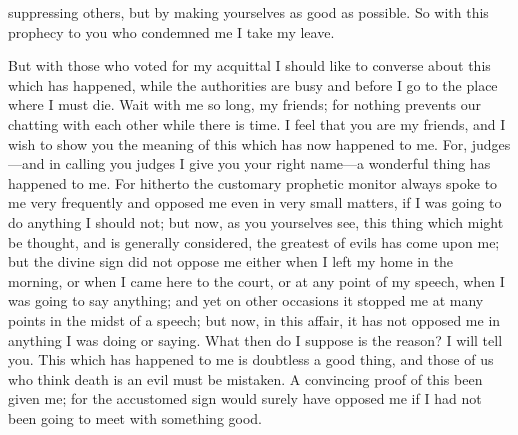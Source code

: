 suppressing others, but by making yourselves as good as possible. So with this prophecy to you who condemned me  I take my leave.

But with those who voted for my acquittal I should like to converse about this which has happened, while the authorities are busy and before I go to the place where I must die. Wait with me so long, my friends; for nothing prevents our chatting with each other  while there is time. I feel that you are my friends, and I wish to show you the meaning of this which has now happened to me. For, judges—and in calling you judges I give you your right name—a wonderful thing has happened to me. For hitherto the customary prophetic monitor always spoke to me very frequently and opposed me even in very small matters, if I was going to do anything I should not; but now, as you yourselves see, this thing which might be thought, and is generally considered, the greatest of evils has come upon me; but the divine sign did not oppose me  either when I left my home in the morning, or when I came here to the court, or at any point of my speech, when I was going to say anything; and yet on other occasions it stopped me at many points in the midst of a speech; but now, in this affair, it has not opposed me in anything I was doing or saying. What then do I suppose is the reason? I will tell you. This which has happened to me is doubtless a good thing, and those of us who think death is an evil  must be mistaken. A convincing proof of this been given me; for the accustomed sign would surely have opposed me if I had not been going to meet with something good.

